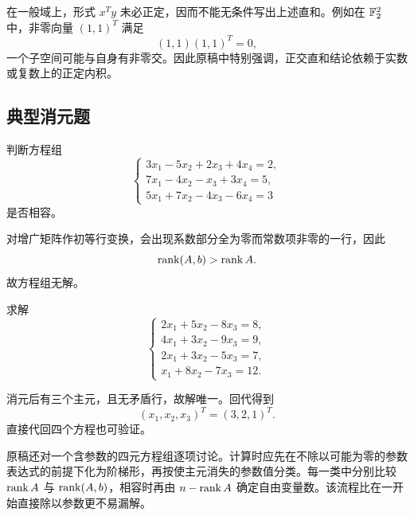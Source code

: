 \begin{remark}
在一般域上，形式 $x^Ty$ 未必正定，因而不能无条件写出上述直和。例如在 $\mathbb F_2^2$ 中，非零向量 $(1,1)^T$ 满足
\begin{equation}
 (1,1)(1,1)^T=0,
\end{equation}
一个子空间可能与自身有非零交。因此原稿中特别强调，正交直和结论依赖于实数或复数上的正定内积。
\end{remark}

\subsection{典型消元题}

\begin{exercise}
判断方程组
\begin{equation}
\begin{cases}
 3x_1-5x_2+2x_3+4x_4=2,\\
 7x_1-4x_2-x_3+3x_4=5,\\
 5x_1+7x_2-4x_3-6x_4=3
\end{cases}
\end{equation}
是否相容。
\end{exercise}

\begin{solution}
对增广矩阵作初等行变换，会出现系数部分全为零而常数项非零的一行，因此
\begin{equation}
 \operatorname{rank}(A,b)>\operatorname{rank} A.
\end{equation}
故方程组无解。
\end{solution}

\begin{exercise}
求解
\begin{equation}
\begin{cases}
 2x_1+5x_2-8x_3=8,\\
 4x_1+3x_2-9x_3=9,\\
 2x_1+3x_2-5x_3=7,\\
 x_1+8x_2-7x_3=12.
\end{cases}
\end{equation}
\end{exercise}

\begin{solution}
消元后有三个主元，且无矛盾行，故解唯一。回代得到
\begin{equation}
 (x_1,x_2,x_3)^T=(3,2,1)^T.
\end{equation}
直接代回四个方程也可验证。
\end{solution}

\begin{remark}[含参数方程组的统一处理]
原稿还对一个含参数的四元方程组逐项讨论。计算时应先在不除以可能为零的参数表达式的前提下化为阶梯形，再按使主元消失的参数值分类。每一类中分别比较 $\operatorname{rank} A$ 与 $\operatorname{rank}(A,b)$，相容时再由 $n-\operatorname{rank} A$ 确定自由变量数。该流程比在一开始直接除以参数更不易漏解。
\end{remark}

